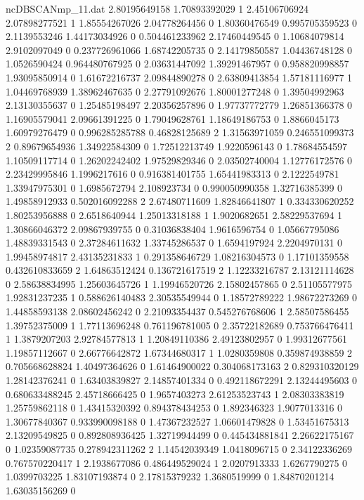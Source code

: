 \begin{filecontents}{ncDBSCANmp_11.dat}
2.80195649158 1.70893392029 1
2.45106706924 2.07898277521 1
1.85554267026 2.04778264456 0
1.80360476549 0.995705359523 0
2.1139553246 1.44173034926 0
0.504461233962 2.17460449545 0
1.10684079814 2.9102097049 0
0.237726961066 1.68742205735 0
2.14179850587 1.04436748128 0
1.0526590424 0.964480767925 0
2.03631447092 1.39291467957 0
0.958820998857 1.93095850914 0
1.61672216737 2.09844890278 0
2.63809413854 1.57181116977 1
1.04469768939 1.38962467635 0
2.27791092676 1.80001277248 0
1.39504992963 2.13130355637 0
1.25485198497 2.20356257896 0
1.97737772779 1.26851366378 0
1.16905579041 2.09661391225 0
1.79049628761 1.18649186753 0
1.8866045173 1.60979276479 0
0.996285285788 0.46828125689 2
1.31563971059 0.246551099373 2
0.89679654936 1.34922584309 0
1.72512213749 1.9220596143 0
1.78684554597 1.10509117714 0
1.26202242402 1.97529829346 0
2.03502740004 1.12776172576 0
2.23429995846 1.1996217616 0
0.916381401755 1.65441983313 0
2.1222549781 1.33947975301 0
1.6985672794 2.108923734 0
0.990050990358 1.32716385399 0
1.49858912933 0.502016092288 2
2.67480711609 1.82846641807 1
0.334330620252 1.80253956888 0
2.6518640944 1.25013318188 1
1.9020682651 2.58229537694 1
1.30866046372 2.09867939755 0
0.31036838404 1.9616596754 0
1.05667795086 1.48839331543 0
2.37284611632 1.33745286537 0
1.6594197924 2.2204970131 0
1.99458974817 2.43135231833 1
0.291358646729 1.08216304573 0
1.17101359558 0.432610833659 2
1.64863512424 0.136721617519 2
1.12233216787 2.13121114628 0
2.58638834995 1.25603645726 1
1.19946520726 2.15802457865 0
2.51105577975 1.92831237235 1
0.588626140483 2.30535549944 0
1.18572789222 1.98672273269 0
1.44858593138 2.08602456242 0
2.21093354437 0.545276768606 1
2.58507586455 1.39752375009 1
1.77113696248 0.761196781005 0
2.35722182689 0.753766476411 1
1.3879207203 2.92784577813 1
1.20849110386 2.49123802957 0
1.99312677561 1.19857112667 0
2.66776642872 1.67344680317 1
1.0280359808 0.359874938859 2
0.705668628824 1.40497364626 0
1.61464900022 0.304068173163 2
0.829310320129 1.28142376241 0
1.63403839827 2.14857401334 0
0.492118672291 2.13244495603 0
0.680633488245 2.45718666425 0
1.9657403273 2.61253523743 1
2.08303383819 1.25759862118 0
1.43415320392 0.894378434253 0
1.892346323 1.9077013316 0
1.30677840367 0.933990098188 0
1.47367232527 1.06601479828 0
1.53451675313 2.13209549825 0
0.892808936425 1.32719944499 0
0.445434881841 2.26622175167 0
1.02359087735 0.278942311262 2
1.14542039349 1.0418096715 0
2.34122336269 0.767570220417 1
2.1938677086 0.486449529024 1
2.0207913333 1.6267790275 0
1.0399703225 1.83107193874 0
2.17815379232 1.3680519999 0
1.84870201214 1.63035156269 0

\end{filecontents}
